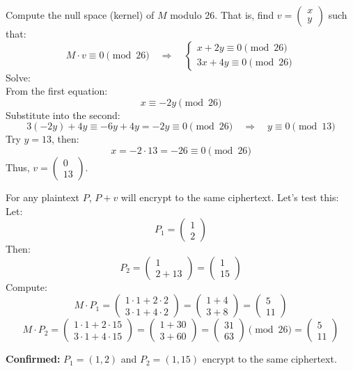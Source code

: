 \documentclass[12pt]{article}
\begin{document}
Compute the null space (kernel) of \( M \) modulo 26. That is, find \( v = \begin{pmatrix} x \\ y \end{pmatrix} \) such that:
\[
M \cdot v \equiv 0 \pmod{26} \quad \Rightarrow \quad
\begin{cases}
x + 2y \equiv 0 \pmod{26} \\
3x + 4y \equiv 0 \pmod{26}
\end{cases}
\]
Solve: \\
From the first equation:
\[
x \equiv -2y \pmod{26}
\]
Substitute into the second:
\[
3(-2y) + 4y \equiv -6y + 4y = -2y \equiv 0 \pmod{26} \quad \Rightarrow \quad y \equiv 0 \pmod{13}
\]
Try \( y = 13 \), then:
\[
x = -2 \cdot 13 = -26 \equiv 0 \pmod{26}
\]
Thus, \( v = \begin{pmatrix} 0 \\ 13 \end{pmatrix} \).

For any plaintext \( P \), \( P + v \) will encrypt to the same ciphertext. Let's test this: \\
Let:
\[
P_1 = \begin{pmatrix} 1 \\ 2 \end{pmatrix}
\]
Then:
\[
P_2 = \begin{pmatrix} 1 \\ 2 + 13 \end{pmatrix} = \begin{pmatrix} 1 \\ 15 \end{pmatrix}
\]
Compute:
\[
M \cdot P_1 = \begin{pmatrix}
1 \cdot 1 + 2 \cdot 2 \\
3 \cdot 1 + 4 \cdot 2
\end{pmatrix}
= \begin{pmatrix}
1 + 4 \\
3 + 8
\end{pmatrix}
= \begin{pmatrix}
5 \\
11
\end{pmatrix}
\]
\[
M \cdot P_2 = \begin{pmatrix}
1 \cdot 1 + 2 \cdot 15 \\
3 \cdot 1 + 4 \cdot 15
\end{pmatrix}
= \begin{pmatrix}
1 + 30 \\
3 + 60
\end{pmatrix}
= \begin{pmatrix}
31 \\
63
\end{pmatrix}
\pmod{26}
= \begin{pmatrix}
5 \\
11
\end{pmatrix}
\]

\textbf{Confirmed:} \( P_1 = (1, 2) \) and \( P_2 = (1, 15) \) encrypt to the same ciphertext.
\end{document}
